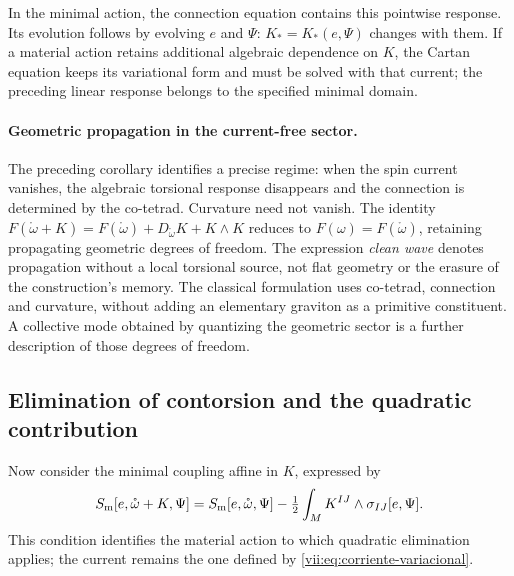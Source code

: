 In the minimal action, the connection equation contains this pointwise
response. Its evolution follows by evolving \(e\) and \(\Psi\):
\(K_*=K_*(e,\Psi)\) changes with them. If a material action retains
additional algebraic dependence on \(K\), the Cartan equation
keeps its variational form and must be solved with that current;
the preceding linear response belongs to the specified minimal domain.


\paragraph{Geometric propagation in the current-free sector.}
The preceding corollary identifies a precise regime: when the spin current
vanishes, the algebraic torsional response disappears and the connection is
determined by the co-tetrad. Curvature need not vanish. The identity
\(F(\mathring\omega+K)=F(\mathring\omega)+D_{\mathring\omega}K+K\wedge K\)
reduces to \(F(\omega)=F(\mathring\omega)\), retaining propagating geometric
degrees of freedom. The expression \emph{clean wave} denotes propagation
without a local torsional source, not flat geometry or the erasure of the
construction's memory. The classical formulation uses co-tetrad, connection
and curvature, without adding an elementary graviton as a primitive
constituent. A collective mode obtained by quantizing the geometric sector
is a further description of those degrees of freedom.

\subsection{Elimination of contorsion and the quadratic contribution}
\label{vii:subsec:respuesta-cuadratica}

Now consider the minimal coupling affine in \(K\), expressed by
\begin{equation}
 S_{\rm m}[e,\mathring\omega+K,\Psi]
 =S_{\rm m}[e,\mathring\omega,\Psi]
   -\tfrac12\int_M K^{IJ}\wedge\sigma_{IJ}[e,\Psi].
 \label{vii:eq:materia-afin-contorsion}
\end{equation}
This condition identifies the material action to which quadratic
elimination applies; the current remains the one defined by
\eqref{vii:eq:corriente-variacional}.


